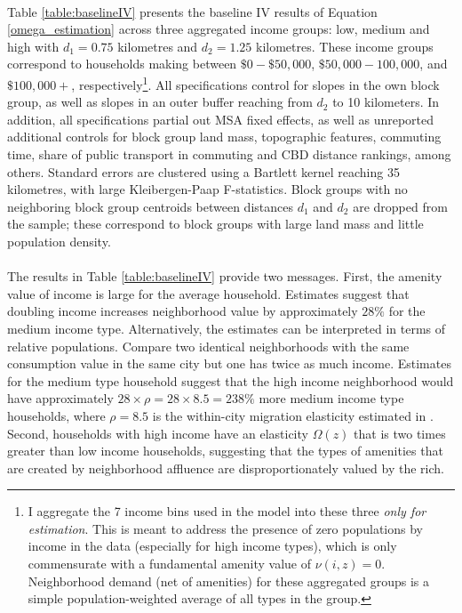 \documentclass[12pt]{article}
\begin{document}
\paragraph*{}
Table \ref{table:baselineIV} presents the baseline IV results of Equation \eqref{omega_estimation} across three aggregated income groups: low, medium and high with $d_{1} = 0.75$ kilometres and $d_{2} = 1.25$ kilometres. These income groups correspond to households making between $\$0 - \$50,000$, $\$50,000 - 100,000$, and $\$100,000+$, respectively\footnote{I aggregate the 7 income bins used in the model into these three \textit{only for estimation}. This is meant to address the presence of zero populations by income in the data (especially for high income types), which is only commensurate with a fundamental amenity value of $\nu(i, z) = 0$. Neighborhood demand (net of amenities) for these aggregated groups is a simple population-weighted average of all types in the group.}. All specifications control for slopes in the own block group, as well as slopes in an outer buffer reaching from $d_{2}$ to 10 kilometers. In addition, all specifications partial out MSA fixed effects, as well as unreported additional controls for block group land mass, topographic features, commuting time, share of public transport in commuting and CBD distance rankings, among others. Standard errors are clustered using a Bartlett kernel reaching 35 kilometres, with large  Kleibergen-Paap F-statistics. Block groups with no neighboring block group centroids between distances $d_{1}$ and $d_{2}$ are dropped from the sample; these correspond to block groups with large land mass and little population density.

\paragraph*{}
The results in Table \ref{table:baselineIV} provide two messages. First, the amenity value of income is large for the average household. Estimates suggest that doubling income increases neighborhood value by approximately $28 \%$ for the medium income type. Alternatively, the estimates can be interpreted in terms of relative populations. Compare two identical neighborhoods with the same consumption value in the same city but one has twice as much income. Estimates for the medium type household suggest that the high income neighborhood would have approximately $28 \times \rho = 28 \times 8.5 = 238 \%$ more medium income type households, where $\rho=8.5$ is the within-city migration elasticity estimated in \cite{BSH}. Second, households with high income have an elasticity $\Omega(z)$ that is two times greater than low income households, suggesting that the types of amenities that are created by neighborhood affluence are disproportionately valued by the rich.
\end{document}
